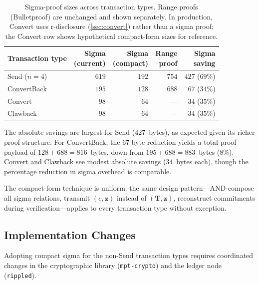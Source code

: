 \documentclass[11pt]{article}
\theoremstyle{definition}
\begin{document}
\begin{table}[htbp]
  \centering
  \caption{Sigma-proof sizes across transaction types.
    Range proofs (Bulletproof) are unchanged and shown separately.
    In production, Convert uses r-disclosure (\cref{sec:convert})
    rather than a sigma proof; the Convert row shows hypothetical
    compact-form sizes for reference.}
  \label{tab:cross-tx}
  \begin{tabular}{l@{\quad}r@{\quad}r@{\quad}r@{\quad}r}
    \toprule
    Transaction type
    & \shortstack{Sigma\\(current)}
    & \shortstack{Sigma\\(compact)}
    & \shortstack{Range\\proof}
    & \shortstack{Sigma\\saving} \\
    \midrule
    \textsf{Send} ($n{=}4$)
      & $619$ & $192$ & $754$ & $427$ ($69\%$) \\
    \textsf{ConvertBack}
      & $195$ & $128$ & $688$ & $67$ ($34\%$) \\
    \textsf{Convert}
      & $98$ & $64$ & --- & $34$ ($35\%$) \\
    \textsf{Clawback}
      & $98$ & $64$ & --- & $34$ ($35\%$) \\
    \bottomrule
  \end{tabular}
\end{table}

\noindent
The absolute savings are largest for \textsf{Send} ($427$~bytes), as
expected given its richer proof structure.
For \textsf{ConvertBack}, the $67$-byte reduction yields a total proof
payload of $128 + 688 = 816$~bytes, down from
$195 + 688 = 883$~bytes ($8\%$).
Convert and Clawback see modest absolute savings ($34$~bytes each),
though the percentage reduction in sigma overhead is comparable.

The compact-form technique is uniform: the same design
pattern---AND-compose all sigma relations, transmit $(e, \mathbf{z})$
instead of $(\mathbf{T}, \mathbf{z})$, reconstruct commitments during
verification---applies to every transaction type without exception.

\subsection{Implementation Changes}
\label{sec:other-tx-impl}

Adopting compact sigma for the non-Send transaction types requires
coordinated changes in the cryptographic library
(\texttt{mpt-crypto}) and the ledger node (\texttt{rippled}).
\end{document}
